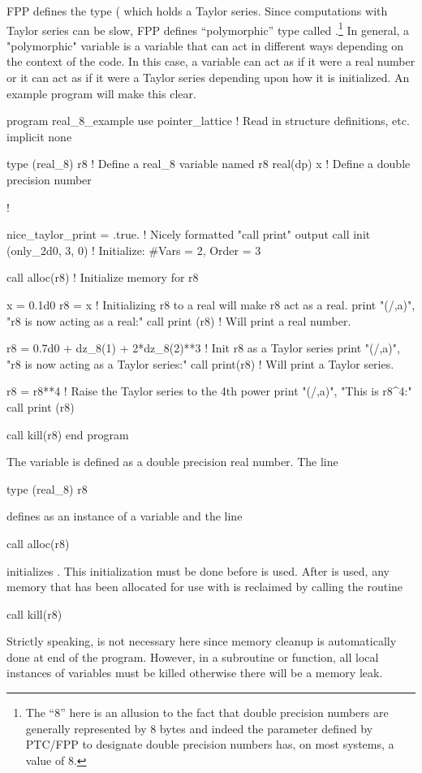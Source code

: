 \documentclass{hitec}     %
\begin{document}
FPP defines the  type ( which holds a Taylor series. Since computations
with Taylor series can be slow, FPP defines ``polymorphic'' type called .\footnote
  {
The ``8'' here is an allusion to the fact that double precision numbers are generally represented
by 8 bytes and indeed the  parameter defined by PTC/FPP to designate double precision numbers
has, on most systems, a value of 8.
  }
 In general, a
"polymorphic" variable is a variable that can act in different ways depending on the context of the
code. In this case, a  variable can act as if it were a real number or it can act as if
it were a Taylor series depending upon how it is initialized. An example program will make this clear.
\begin{code}
program real_8_example
use pointer_lattice   ! Read in structure definitions, etc.
implicit none

type (real_8) r8      ! Define a real_8 variable named r8
real(dp) x            ! Define a double precision number

!

nice_taylor_print = .true.    ! Nicely formatted "call print" output
call init (only_2d0, 3, 0)    ! Initialize: #Vars = 2, Order = 3

call alloc(r8)          ! Initialize memory for r8

x = 0.1d0
r8 = x                  ! Initializing r8 to a real will make r8 act as a real.
print "(/,a)", "r8 is now acting as a real:"
call print (r8)         ! Will print a real number.

r8 = 0.7d0 + dz_8(1) + 2*dz_8(2)**3   ! Init r8 as a Taylor series
print "(/,a)", "r8 is now acting as a Taylor series:"
call print(r8)                        ! Will print a Taylor series.

r8 = r8**4  ! Raise the Taylor series to the 4th power
print "(/,a)", "This is r8^4:"
call print (r8)

call kill(r8)
end program
\end{code}
The variable  is defined as a double precision real number. The line
\begin{example}
  type (real_8) r8
\end{example}
defines  as an instance of a  variable and the line
\begin{example}
  call alloc(r8)
\end{example}
initializes . This initialization must be done before  is used. After  is used,
any memory that has been allocated for use with  is reclaimed by calling the 
routine
\begin{example}
  call kill(r8)
\end{example}
Strictly speaking,  is not necessary here since memory cleanup is automatically done at end
of the program. However, in a subroutine or function, all local instances of  variables
must be killed otherwise there will be a memory leak.
\end{document}
